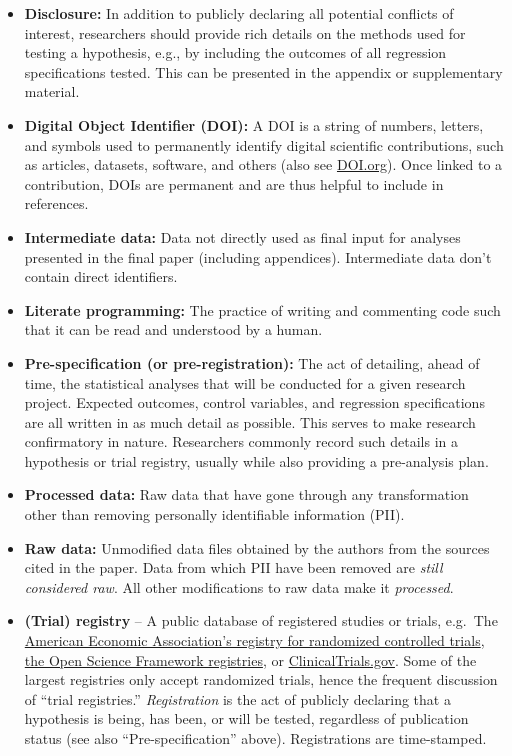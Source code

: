\documentclass[
]{book}
\begin{document}
\begin{itemize}
\item
  \textbf{Disclosure:} In addition to publicly declaring all potential conflicts of interest, researchers should provide rich details on the methods used for testing a hypothesis, e.g., by including the outcomes of all regression specifications tested. This can be presented in the appendix or supplementary material.
\item
  \textbf{Digital Object Identifier (DOI):} A DOI is a string of numbers, letters, and symbols used to permanently identify digital scientific contributions, such as articles, datasets, software, and others (also see \href{https://www.doi.org/}{DOI.org}). Once linked to a contribution, DOIs are permanent and are thus helpful to include in references.
\item
  \textbf{Intermediate data:} Data not directly used as final input for analyses presented in the final paper (including appendices). Intermediate data don't contain direct identifiers.
\item
  \textbf{Literate programming:} The practice of writing and commenting code such that it can be read and understood by a human.
\item
  \textbf{Pre-specification (or pre-registration):} The act of detailing, ahead of time, the statistical analyses that will be conducted for a given research project. Expected outcomes, control variables, and regression specifications are all written in as much detail as possible. This serves to make research confirmatory in nature.
  Researchers commonly record such details in a hypothesis or trial registry, usually while also providing a pre-analysis plan.
\item
  \textbf{Processed data:} Raw data that have gone through any transformation other than removing personally identifiable information (PII).\\
\item
  \textbf{Raw data:} Unmodified data files obtained by the authors from the sources cited in the paper. Data from which PII have been removed are \emph{still considered raw}. All other modifications to raw data make it \emph{processed}.\\
\item
  \textbf{(Trial) registry} -- A public database of registered studies or trials, e.g.~The \href{https://www.socialscienceregistry.org/}{American Economic Association's registry for randomized controlled trials}, \href{https://osf.io/prereg/}{the Open Science Framework registries}, or \href{https://www.clinicaltrials.gov/}{ClinicalTrials.gov}. Some of the largest registries only accept randomized trials, hence the frequent discussion of ``trial registries.'' \emph{Registration} is the act of publicly declaring that a hypothesis is being, has been, or will be tested, regardless of publication status (see also ``Pre-specification'' above). Registrations are time-stamped.

\end{itemize}
\end{document}
